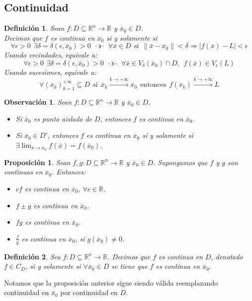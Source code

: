 \documentclass[11pt]{report}
\newtheorem{definition}{Definición}[section]
\newtheorem{observation}{Observación}[section]
\newtheorem{proposition}{Proposición}[section]
\newcommand{\Rn}{\mathbb{R}^{n}}
\newcommand{\R}{\mathbb{R}}
\newcommand{\x}{\overline{x}}
\newcommand{\xz}{\overline{x}_{0}}
\newcommand{\tq}{\cdot\backepsilon\cdot}
\begin{document}
\subsection{Continuidad}

\begin{definition} Sean $f:D\subseteq\Rn\rightarrow\R$ y $\xz\in D$.\\
Decimos que $f$ es continua en $\xz$ si y solamente si
$$\forall\epsilon>0\ \ \exists\delta=\delta(\epsilon, \xz)>0\ \ \tq\ \ \forall\x\in D\ \ \text{si}\ \ \| \x-\xz \|<\delta\Rightarrow|f(\x)-L|<\epsilon$$
Usando vecindades, equivale a:
$$\forall\epsilon>0\ \ \exists\delta=\delta(\epsilon, \xz)>0\ \ \tq\ \ \forall\x\in V_{\delta}(\xz)\cap D,\ \ f(\x)\in V_{\epsilon}(L)$$
Usando sucesiones, equivale a:
$$\forall(\x_{k})_{k=1}^{+\infty}\subseteq D\ \ \text{si}\ \ \x_{k}\xrightarrow{k\rightarrow+\infty}\xz\ \ \text{entonces}\ \ f(\x_{k})\xrightarrow{k\rightarrow+\infty}L$$
\end{definition}

\begin{observation} Sean $f:D\subseteq\Rn\rightarrow\R$ y $\xz\in D$.
\begin{itemize}
\item[(i)] Si $\xz$ es punto aislado de $D$, entonces $f$ es continua en $\xz$.
\item[(ii)] Si $\xz\in D'$, entonces $f$ es continua en $\xz$ si y solamente si $\exists\lim_{\x\to\xz}f(\x)=f(\xz)$.
\end{itemize}
\end{observation}

\begin{proposition}
Sean $f, g:D\subseteq\Rn\rightarrow\R$ y $\xz\in D$. Supongamos que $f$ y $g$ son continuas en $\xz$. Entonces:
\begin{itemize}
\item[(i)] $cf$ es continua en $\xz$, $\forall c\in\R$.
\item[(ii)] $f\pm g$ es continua en $\xz$.
\item[(iii)] $fg$ es continua en $\xz$.
\item[(iv)] $\frac{f}{g}$ es continua en $\xz$, si $g(\xz)\ne0$.
\end{itemize}
\end{proposition}

\begin{definition} Sea $f:D\subseteq\Rn\rightarrow\R$. Decimos que $f$ es continua en $D$, denotado $f\in C_{D}$, si y solamente si $\forall\xz\in D$ se tiene que $f$ es continua en $\xz$.
\end{definition}
Notamos que la proposición anterior sigue siendo válida reemplazando continuidad en $\xz$ por continuidad en $D$.
\end{document}
